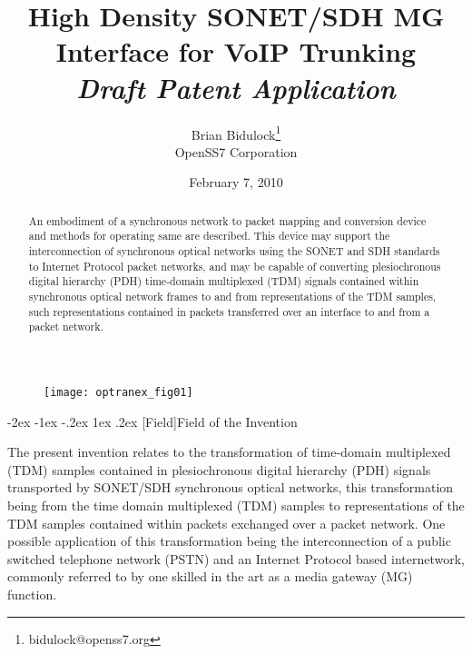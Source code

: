 \documentclass[letterpaper,final,notitlepage,twocolumn,10pt,twoside]{article}
\makeatletter
\let\large = \normalsize
\let\normalsize = \small
\let\small = \footnotesize
\let\footnotesize = \scriptsize
\let\scriptsize = \tiny
\renewcommand\section{\@startsection {section}{1}{\z@}%
                                   {-2ex \@plus -1ex \@minus -.2ex}%
                                   {1ex \@plus .2ex}%
                                   {\normalfont\large\bfseries}}
\makeatother
\begin{document}

\title{High Density SONET/SDH MG Interface for VoIP Trunking\\[0.5ex]
	{\large \textsl{Draft Patent Application}}}
\author{Brian Bidulock\thanks{bidulock@openss7.org}\\
	OpenSS7 Corporation}
\date{February 7, 2010}
\maketitle

\begin{abstract}
An embodiment of a synchronous network to packet mapping and conversion device
and methods for operating same are described.  This device may support the
interconnection of synchronous optical networks using the SONET and SDH
standards to Internet Protocol packet networks, and may be capable of
converting plesiochronous digital hierarchy (PDH) time-domain multiplexed
(TDM) signals contained within synchronous optical network frames to and from
representations of the TDM samples, such representations contained in packets
transferred over an interface to and from a packet network.
\end{abstract}


\FloatBarrier
{}


\begin{figure}[htp]
\center\texttt{[image: optranex\_fig01]}
\label{figure:optranex_fig01}
\end{figure}

\section[Field]{Field of the Invention}

The present invention relates to the transformation of time-domain multiplexed
(TDM) samples contained in plesiochronous digital hierarchy (PDH) signals
transported by SONET/SDH synchronous optical networks, this transformation
being from the time domain multiplexed (TDM) samples to representations of the
TDM samples contained within packets exchanged over a packet network.  One
possible application of this transformation being the interconnection of a
public switched telephone network (PSTN) and an Internet Protocol based
internetwork, commonly referred to by one skilled in the art as a media
gateway (MG) function.
\end{document}
